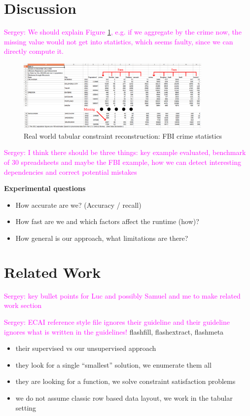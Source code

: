 \documentclass{ecai}
\newcommand{\sergey}[1]{\textcolor{magenta}{{\sc Sergey:} #1}\xspace}
\begin{document}
\section{Discussion}
\sergey{We should explain Figure \ref{fig:fbi}, e.g. if we aggregate by the crime now, the missing value would not get into statistics, which seems faulty, since we can directly compute it.}

\begin{figure}[thb]
  \begin{center}
    \includegraphics[width=0.85\textwidth]{figures/fbi_figure_highlighted.png}
  \end{center}
  \caption{Real world tabular constraint reconstruction: FBI crime statistics}
  \label{fig:fbi}
\end{figure}


\sergey{I think there should be three things: key example evaluated, benchmark of 30 spreadsheets and maybe the FBI example, how we can detect interesting dependencies and correct potential mistakes}


{\bfseries
  Experimental questions
}

\begin{itemize}
  \item  How accurate are we? (Accuracy / recall)
  \item  How fast are we and which factors affect the runtime (how)?
  \item  How general is our approach, what limitations are there?
\end{itemize}


\section{Related Work}
\sergey{key bullet points for Luc and possibly Samuel and me to make related work section}

\sergey{ECAI reference style file ignores their guideline and their guideline ignores what is written in the guidelines!}
flashfill, flashextract, flashmeta \cite{flashfill,flashextract,flashmeta}
\begin{itemize}
  \item their supervised vs our unsupervised approach
  \item they look for a single ``smallest'' solution, we enumerate them all
  \item they are looking for a function, we solve constraint satisfaction problems
  \item we do not assume classic row based data layout, we work in the tabular setting
\end{itemize}
\end{document}
